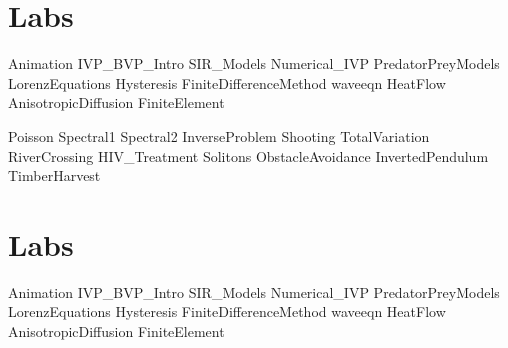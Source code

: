 \documentclass[opener-c,labs,green,nociteref]{HJnewsiambook}
\begin{document}
\ifbyu

\part{Labs} %
{Animation}
{IVP_BVP_Intro}
{SIR_Models}
{Numerical_IVP} 
{PredatorPreyModels}
{LorenzEquations}
{Hysteresis}
{FiniteDifferenceMethod}
{waveeqn}
{HeatFlow}
{AnisotropicDiffusion}
{FiniteElement}

{Poisson}
{Spectral1}
{Spectral2}
{InverseProblem}
{Shooting}
{TotalVariation}
{RiverCrossing}
{HIV_Treatment}
{Solitons}
{ObstacleAvoidance}
{InvertedPendulum}
{TimberHarvest}

\else 

\part{Labs} %
{Animation}
{IVP_BVP_Intro}
{SIR_Models}
{Numerical_IVP} 
{PredatorPreyModels}
{LorenzEquations}
{Hysteresis}
{FiniteDifferenceMethod}
{waveeqn}
{HeatFlow}
{AnisotropicDiffusion}
{FiniteElement}
\end{document}
